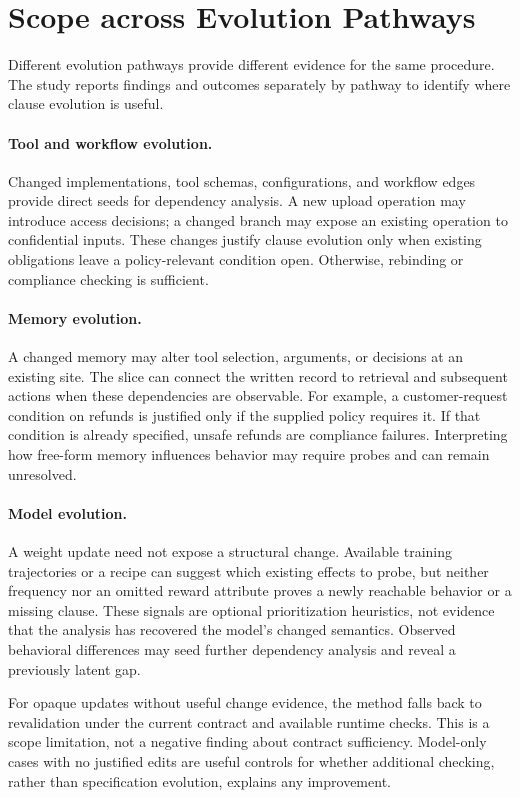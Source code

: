 \section{Scope across Evolution Pathways}
\label{sec:pathways}
Different evolution pathways provide different evidence for the same procedure. The study reports findings and outcomes separately by pathway to identify where clause evolution is useful.

\paragraph{Tool and workflow evolution.}
Changed implementations, tool schemas, configurations, and workflow edges provide direct seeds for dependency analysis. A new upload operation may introduce access decisions; a changed branch may expose an existing operation to confidential inputs. These changes justify clause evolution only when existing obligations leave a policy-relevant condition open. Otherwise, rebinding or compliance checking is sufficient.

\paragraph{Memory evolution.}
A changed memory may alter tool selection, arguments, or decisions at an existing site. The slice can connect the written record to retrieval and subsequent actions when these dependencies are observable. For example, a customer-request condition on refunds is justified only if the supplied policy requires it. If that condition is already specified, unsafe refunds are compliance failures. Interpreting how free-form memory influences behavior may require probes and can remain unresolved.

\paragraph{Model evolution.}
A weight update need not expose a structural change. Available training trajectories or a recipe can suggest which existing effects to probe, but neither frequency nor an omitted reward attribute proves a newly reachable behavior or a missing clause. These signals are optional prioritization heuristics, not evidence that the analysis has recovered the model's changed semantics. Observed behavioral differences may seed further dependency analysis and reveal a previously latent gap.

For opaque updates without useful change evidence, the method falls back to revalidation under the current contract and available runtime 
checks. This is a scope limitation, not a negative finding about contract sufficiency. Model-only cases with no justified edits are useful controls for whether additional checking, rather than specification evolution, explains any improvement.

